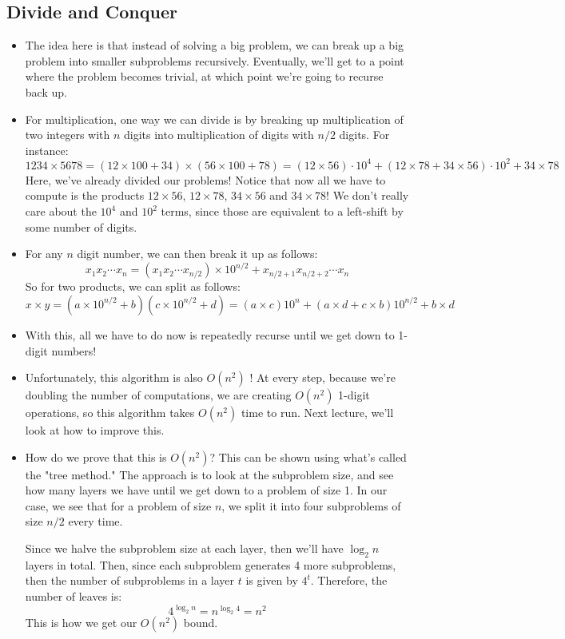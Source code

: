\subsection{Divide and Conquer}
\begin{itemize}
	\item The idea here is that instead of solving a big problem, we can break up a big problem into smaller subproblems recursively.
		Eventually, we'll get to a point where the problem becomes trivial, at which point we're going to recurse back up. 
	\item For multiplication, one way we can divide is by breaking up multiplication of two integers with \( n \) digits into 
		multiplication of digits with \( n/2 \) digits. For instance:
		\[
		1234 \times 5678 = (12 \times 100 + 34) \times (56 \times 100 + 78) = (12 \times 56) \cdot 10^{4} + 
		(12 \times 78 + 34 \times 56) \cdot 10^2 + 34 \times 78
		\] 
		Here, we've already divided our problems! Notice that now all we have to compute is the products 
		\( 12 \times 56 \), \( 12 \times 78 \), \( 34 \times 56 \) and \( 34 \times 78 \)! We don't really care about 
		the \( 10^{4} \) and \( 10^2 \) terms, since those are equivalent to a left-shift by some number of digits.    
	\item For any \( n \) digit number, we can then break it up as follows:
		\[
		x_1x_2\cdots x_n = (x_1x_2 \cdots x_{n / 2}) \times 10^{n / 2} + x_{n / 2 + 1}x_{n / 2 + 2} \cdots x_n
		\] 
		So for two products, we can split as follows:
		\[
		x \times y = (a \times 10^{n / 2} + b)(c \times 10^{n /2} + d) = (a \times c) 10^{n} + (a \times d + c \times b) 10^{n /2}
		 + b\times d
		\] 
	\item With this, all we have to do now is repeatedly recurse until we get down to 1-digit numbers!
	\item Unfortunately, this algorithm is also \( O(n^2) \) ! At every step, because we're doubling the number of computations, 
		we are creating \( O(n^2) \) 1-digit operations, so this algorithm takes \( O(n^2) \) time to run. Next lecture, we'll 
		look at how to improve this.
	\item How do we prove that this is \( O(n^2) \)? This can be shown using what's called the "tree method." The approach 
		is to look at the subproblem size, and see how many layers we have until we get down to a problem of size 1. In our 
		case, we see that for a problem of size \( n \), we split it into four subproblems of size \( n / 2 \) every time. 

		Since we halve the subproblem size at each layer, then we'll have \( \log_2 n \) layers in total. Then, since each 
		subproblem generates 4 more subproblems, then the number of subproblems in a layer \( t \) is given by \( 4^{t} \).  
		Therefore, the number of leaves is:
		\[
			4^{\log_2 n} = n ^{\log_2 4} = n^2
		\]
		This is how we get our \( O(n^2) \) bound. 

\end{itemize}
